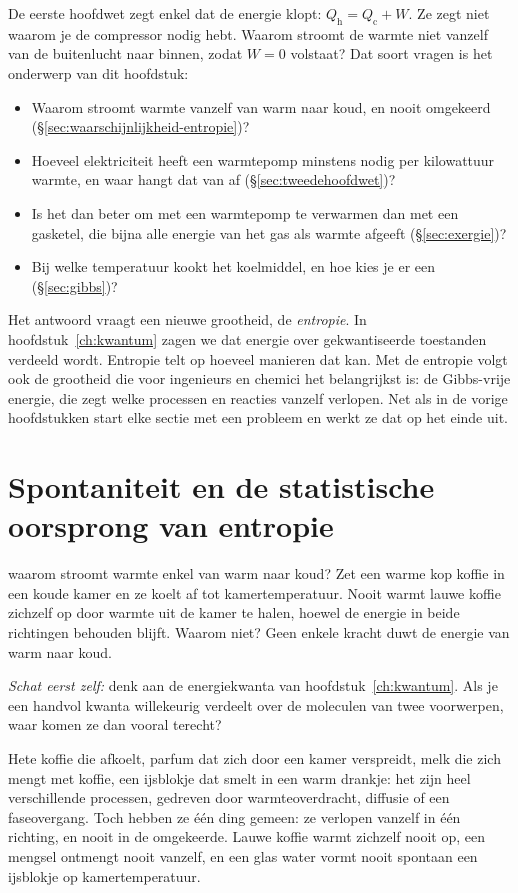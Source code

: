 De eerste hoofdwet zegt enkel dat de energie klopt: $Q_\mathrm{h} = Q_\mathrm{c} + W$. Ze zegt niet waarom je de compressor nodig hebt. Waarom stroomt de warmte niet vanzelf van de buitenlucht naar binnen, zodat $W = 0$ volstaat? Dat soort vragen is het onderwerp van dit hoofdstuk:
\begin{itemize}
\item Waarom stroomt warmte vanzelf van warm naar koud, en nooit omgekeerd (\S\ref{sec:waarschijnlijkheid-entropie})?
\item Hoeveel elektriciteit heeft een warmtepomp minstens nodig per kilowattuur warmte, en waar hangt dat van af (\S\ref{sec:tweedehoofdwet})?
\item Is het dan beter om met een warmtepomp te verwarmen dan met een gasketel, die bijna alle energie van het gas als warmte afgeeft (\S\ref{sec:exergie})?
\item Bij welke temperatuur kookt het koelmiddel, en hoe kies je er een (\S\ref{sec:gibbs})?
\end{itemize}
Het antwoord vraagt een nieuwe grootheid, de \emph{entropie}. In hoofdstuk~\ref{ch:kwantum} zagen we dat energie over gekwantiseerde toestanden verdeeld wordt. Entropie telt op hoeveel manieren dat kan. Met de entropie volgt ook de grootheid die voor ingenieurs en chemici het belangrijkst is: de Gibbs-vrije energie, die zegt welke processen en reacties vanzelf verlopen. Net als in de vorige hoofdstukken start elke sectie met een probleem en werkt ze dat op het einde uit.

\section{Spontaniteit en de statistische oorsprong van entropie}

\begin{casus}{waarom stroomt warmte enkel van warm naar koud?}
Zet een warme kop koffie in een koude kamer en ze koelt af tot kamertemperatuur. Nooit warmt lauwe koffie zichzelf op door warmte uit de kamer te halen, hoewel de energie in beide richtingen behouden blijft. Waarom niet? Geen enkele kracht duwt de energie van warm naar koud.

\emph{Schat eerst zelf:} denk aan de energiekwanta van hoofdstuk~\ref{ch:kwantum}. Als je een handvol kwanta willekeurig verdeelt over de moleculen van twee voorwerpen, waar komen ze dan vooral terecht?
\end{casus}

Hete koffie die afkoelt, parfum dat zich door een kamer verspreidt, melk die zich mengt met koffie, een ijsblokje dat smelt in een warm drankje: het zijn heel verschillende processen, gedreven door warmteoverdracht, diffusie of een faseovergang. Toch hebben ze \'e\'en ding gemeen: ze verlopen vanzelf in \'e\'en richting, en nooit in de omgekeerde. Lauwe koffie warmt zichzelf nooit op, een mengsel ontmengt nooit vanzelf, en een glas water vormt nooit spontaan een ijsblokje op kamertemperatuur.

